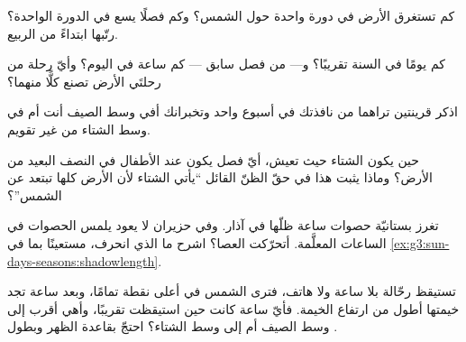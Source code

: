\begin{exercise}[$\star$]\label{exo:g3:sun-days-seasons:6}
كم تستغرق الأرض في دورة واحدة حول الشمس؟ وكم فصلًا يسع في الدورة
الواحدة؟ رتّبها ابتداءً من الربيع.
\end{exercise}

\begin{exercise}[$\star$]\label{exo:g3:sun-days-seasons:7}
كم يومًا في السنة تقريبًا؟ و--- من فصل سابق --- كم ساعة في
اليوم؟ وأيّ رحلة من رحلتَي الأرض تصنع كلًّا منهما؟
\end{exercise}

\begin{exercise}[$\star$]\label{exo:g3:sun-days-seasons:8}
اذكر قرينتين تراهما من نافذتك في أسبوع واحد وتخبرانك أفي وسط
الصيف أنت أم في وسط الشتاء من غير تقويم.
\end{exercise}

\begin{exercise}[$\star$]\label{exo:g3:sun-days-seasons:9}
حين يكون الشتاء حيث تعيش، أيّ فصل يكون عند الأطفال في النصف
البعيد من الأرض؟ وماذا يثبت هذا في حقّ الظنّ القائل ``يأتي
الشتاء لأن الأرض كلها تبتعد عن الشمس''؟
\end{exercise}

\begin{exercise}[$\star\star$]\label{exo:g3:sun-days-seasons:10}
تغرز بستانيّة حصوات ساعة ظلّها في آذار. وفي حزيران لا يعود 
يلمس الحصوات في الساعات المعلَّمة. أتحرّكت العصا؟ اشرح ما الذي
انحرف، مستعينًا بما في
\cref{ex:g3:sun-days-seasons:shadowlength}.
\end{exercise}

\begin{exercise}[$\star\star$]\label{exo:g3:sun-days-seasons:11}
تستيقظ رحّالة بلا ساعة ولا هاتف، فترى الشمس في أعلى نقطة تمامًا،
وبعد ساعة تجد  خيمتها أطول من ارتفاع الخيمة. فأيّ ساعة كانت
حين استيقظت تقريبًا، وأهي أقرب إلى وسط الصيف أم إلى وسط الشتاء؟
احتجّ بقاعدة الظهر وبطول .
\end{exercise}
